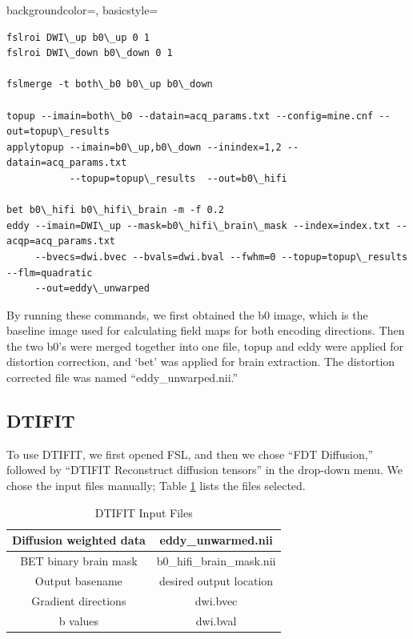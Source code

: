 {
    backgroundcolor=\color{white},
    basicstyle=\scriptsize\color{black}\ttfamily
}

\begin{lstlisting}[style=DOS]
fslroi DWI\_up b0\_up 0 1
fslroi DWI\_down b0\_down 0 1

fslmerge -t both\_b0 b0\_up b0\_down

topup --imain=both\_b0 --datain=acq_params.txt --config=mine.cnf --out=topup\_results
applytopup --imain=b0\_up,b0\_down --inindex=1,2 --datain=acq_params.txt
           --topup=topup\_results  --out=b0\_hifi

bet b0\_hifi b0\_hifi\_brain -m -f 0.2
eddy --imain=DWI\_up --mask=b0\_hifi\_brain\_mask --index=index.txt --acqp=acq_params.txt
     --bvecs=dwi.bvec --bvals=dwi.bval --fwhm=0 --topup=topup\_results --flm=quadratic
     --out=eddy\_unwarped

\end{lstlisting}

By running these commands, we first obtained the b0 image, which is the baseline image used for calculating field maps for both encoding directions. Then the two b0's were merged together into one file, topup and eddy were applied for distortion correction, and `bet' was applied for brain extraction. The distortion corrected file was named ``eddy\_unwarped.nii.''

\subsection{DTIFIT}
\label{sec:dtifit}

To use DTIFIT, we first opened FSL, and then we chose ``FDT Diffusion,'' followed by ``DTIFIT Reconstruct diffusion tensors'' in the drop-down menu. We chose the input files manually; Table \ref{tab:dtifit} lists the files selected.

\begin{table}[H]
\centering
\caption{DTIFIT Input Files}
\label{tab:dtifit}
\begin{tabular}{|c|c|}
\hline
Diffusion weighted data & eddy\_unwarmed.nii        \\ \hline
BET binary brain mask   & b0\_hifi\_brain\_mask.nii \\ \hline
Output basename          & desired output location   \\ \hline
Gradient directions     & dwi.bvec                  \\ \hline
b values                & dwi.bval                  \\ \hline
\end{tabular}
\end{table}

